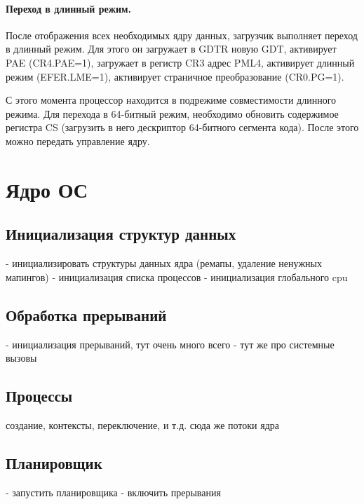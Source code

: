 \paragraph{Переход в длинный режим.} После отображения всех необходимых ядру данных,
загрузчик выполняет переход в длинный режим. Для этого он загружает в GDTR новую GDT,
активирует PAE (CR4.PAE=1), загружает в регистр CR3 адрес PML4, активирует длинный режим
(EFER.LME=1), активирует страничное преобразование (CR0.PG=1).

С этого момента процессор находится в подрежиме совместимости длинного режима.
Для перехода в 64-битный режим, необходимо обновить содержимое регистра CS (загрузить в
него дескриптор 64-битного сегмента кода). После этого можно передать управление ядру.

\section{Ядро ОС}

\subsection{Инициализация структур данных}
- инициализировать структуры данных ядра (ремапы, удаление ненужных мапингов)
- инициализация списка процессов
- инициализация глобального cpu

\subsection{Обработка прерываний}
- инициализация прерываний, тут очень много всего
- тут же про системные вызовы

\subsection{Процессы}
создание, контексты, переключение, и т.д.
сюда же потоки ядра

\subsection{Планировщик}
- запустить планировщика
- включить прерывания
